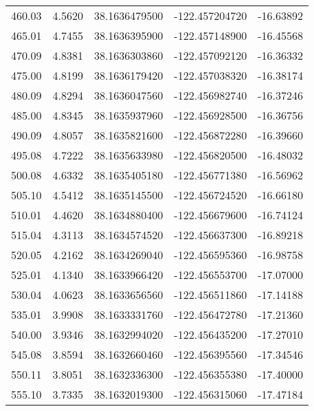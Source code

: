 \begin{longtable}{p{2.5cm}p{2.5cm}p{3cm}p{3cm}p{2.5cm}}
       460.03  & 	 4.5620 &               38.1636479500  &   -122.457204720   &	-16.63892 \\
       465.01  & 	 4.7455 &               38.1636395900  &   -122.457148900   &	-16.45568 \\
       470.09  & 	 4.8381 &               38.1636303860  &   -122.457092120   &	-16.36332 \\
       475.00  & 	 4.8199 &               38.1636179420  &   -122.457038320   &	-16.38174 \\
       480.09  & 	 4.8294 &               38.1636047560  &   -122.456982740   &	-16.37246 \\
       485.00  & 	 4.8345 &               38.1635937960  &   -122.456928500   &	-16.36756 \\
       490.09  & 	 4.8057 &               38.1635821600  &   -122.456872280   &	-16.39660 \\
       495.08  & 	 4.7222 &               38.1635633980  &   -122.456820500   &	-16.48032 \\
       500.08  & 	 4.6332 &               38.1635405180  &   -122.456771380   &	-16.56962 \\
       505.10  & 	 4.5412 &               38.1635145500  &   -122.456724520   &	-16.66180 \\
       510.01  & 	 4.4620 &               38.1634880400  &   -122.456679600   &	-16.74124 \\
       515.04  & 	 4.3113 &               38.1634574520  &   -122.456637300   &	-16.89218 \\
       520.05  & 	 4.2162 &               38.1634269040  &   -122.456595360   &	-16.98758 \\
       525.01  & 	 4.1340 &               38.1633966420  &   -122.456553700   &	-17.07000 \\
       530.04  & 	 4.0623 &               38.1633656560  &   -122.456511860   &	-17.14188 \\
       535.01  & 	 3.9908 &               38.1633331760  &   -122.456472780   &	-17.21360 \\
       540.00  & 	 3.9346 &               38.1632994020  &   -122.456435200   &	-17.27010 \\
       545.08  & 	 3.8594 &               38.1632660460  &   -122.456395560   &	-17.34546 \\
       550.11  & 	 3.8051 &               38.1632336300  &   -122.456355380   &	-17.40000 \\
       555.10  & 	 3.7335 &               38.1632019300  &   -122.456315060   &	-17.47184 \\

\end{longtable}
